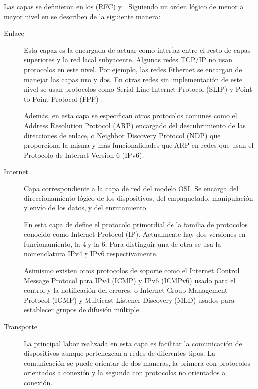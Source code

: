 Las capas se definieron en los  (RFC)
\cite{rfc1122} y \cite{rfc1123}. Siguiendo un orden lógico de menor a mayor
nivel en \cite{kozi05} se describen de la siguiente manera:
\begin{description}
  \item[Enlace] Esta capaz es la encargada de actuar como interfaz entre el
  resto de capas superiores y la red local subyacente. Algunas redes TCP/IP no 
  usan protocolos en este nivel. Por ejemplo, las redes Ethernet se encargan de
  manejar las capas uno y dos. En otras redes sin implementación de este nivel
  se usan protocolos como Serial Line Internet Protocol (SLIP) \cite{rfc1055} y
  Point-to-Point Protocol (PPP) \cite{rfc1661}.

  Además, en esta capa se especifican otros protocolos comunes como el Address
  Resolution Protocol (ARP) \cite{rfc826} encargado del descubrimiento de las
  direcciones de enlace, o Neighbor Discovery Protocol (NDP) \cite{rfc4861} que
  proporciona la misma y más funcionalidades que ARP en redes que usan el
  Protocolo de Internet Version 6 (IPv6).

  \item[Internet] Capa correspondiente a la capa de red del modelo OSI. Se
  encarga del direccionamiento lógico de los dispositivos, del empaquetado,
  manipulación y envío de los datos, y del enrutamiento.
  
  En esta capa de define el protocolo primordial de la familia de protocolos
  conocido como Internet Protocol (IP). Actualmente hay dos versiones en
  funcionamiento, la 4 y la 6. Para distinguir una de otra se usa la
  nomenclatura IPv4 \cite{rfc791} y IPv6 \cite{rfc2460} respectivamente.

  Asimismo existen otros protocolos de soporte como el Internet Control Message
  Protocol para IPv4 (ICMP) \cite{rfc792} y IPv6 (ICMPv6) \cite{rfc4443} usado
  para el control y la notificación del errores, o Internet Group Management
  Protocol (IGMP) \cite{rfc4604} y Multicast Listener Discovery (MLD)
  \cite{rfc4604} usados para establecer grupos de difusión múltiple.

  \item[Transporte] La principal labor realizada en esta capa es facilitar
  la comunicación de dispositivos aunque pertenezcan a redes de diferentes
  tipos. La comunicación se puede orientar de dos maneras, la primera con
  protocolos orientados a conexión y la segunda con protocolos no orientados
  a conexión.


\end{description}
